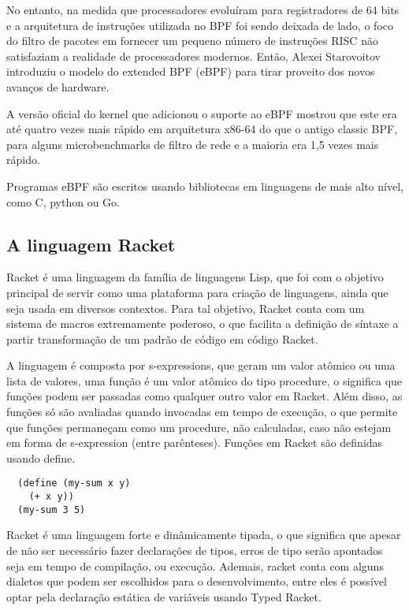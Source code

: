 \documentclass[paper=a4, fontsize=12pt]{article}
\theoremstyle{definition}
\begin{document}
No entanto, na medida que processadores evoluíram para registradores de 64 bits e a arquitetura de
instruções utilizada no BPF foi sendo deixada de lado, o foco do filtro de pacotes em fornecer um
pequeno número de instruções RISC não satisfaziam a realidade de processadores modernos. Então, Alexei
Starovoitov introduziu o modelo do extended BPF (eBPF)  para tirar proveito dos novos avanços de hardware.

A versão oficial do kernel que adicionou o suporte ao eBPF mostrou que este era até quatro vezes mais
rápido em arquitetura x86-64 do que o antigo classic BPF, para alguns microbenchmarks de filtro de rede
e a maioria era 1,5 vezes mais rápido.

Programas eBPF são escritos usando bibliotecas em linguagens de mais alto nível, como C, python ou
Go.

\subsection{A linguagem Racket}

Racket é uma linguagem da família de linguagens Lisp, que foi com o objetivo
principal de servir como uma plataforma para criação de linguagens, ainda que
seja usada em diversos contextos. Para tal objetivo, Racket conta com um
sistema de macros extremamente poderoso, o que facilita a definição de síntaxe
a partir transformação de um padrão de código em código Racket.

A linguagem é composta por s-expressions, que geram um valor atômico ou uma lista de valores,
uma função é um valor atômico do tipo procedure, o significa que funções podem ser passadas como
qualquer outro valor em Racket. Além disso, as funções só são avaliadas quando invocadas em tempo
de execução, o que permite que funções permaneçam como um procedure, não calculadas, caso não estejam
em forma de s-expression (entre parênteses). Funções em Racket são definidas usando define.

\begin{lstlisting}
  (define (my-sum x y)
    (+ x y))
  (my-sum 3 5)
\end{lstlisting}
 
Racket é uma linguagem forte e dinâmicamente tipada, o que significa que apesar de não ser necessário
fazer declarações de tipos, erros de tipo serão apontados seja em tempo de compilação, ou execução.
Ademais, racket conta com alguns dialetos que podem ser escolhidos para o desenvolvimento, entre eles
é possível optar pela declaração estática de variáveis usando Typed Racket.
\end{document}
